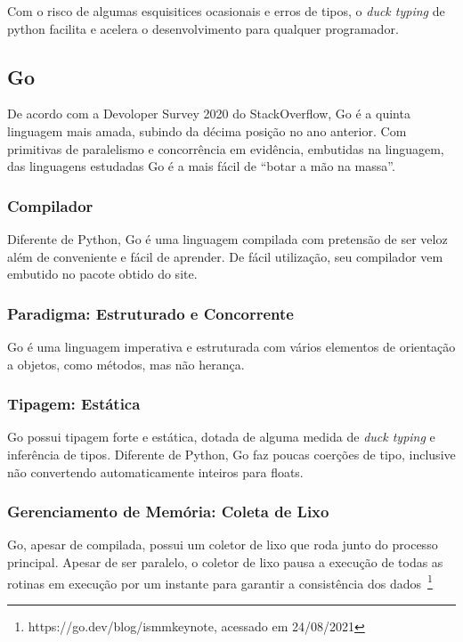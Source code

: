 \documentclass{article}
\begin{document}
Com o risco de algumas esquisitices ocasionais e erros de tipos, o \emph{duck typing} de python facilita e acelera o desenvolvimento para qualquer programador.

\subsection{Go}
\label{ssec:go}

De acordo com a Devoloper Survey 2020 do StackOverflow, Go é a quinta linguagem mais amada, subindo da décima posição no ano anterior. Com primitivas de paralelismo e concorrência em evidência, embutidas na linguagem, das linguagens estudadas Go é a mais fácil de ``botar a mão na massa''.

\subsubsection{Compilador}
\label{sssec:go compilador}

Diferente de Python, Go é uma linguagem compilada com pretensão de ser veloz além de conveniente e fácil de aprender. De fácil utilização, seu compilador vem embutido no pacote obtido do site.

\subsubsection{Paradigma: Estruturado e Concorrente}
\label{sssec:go paradigma}

Go é uma linguagem imperativa e estruturada com vários elementos de orientação a objetos, como métodos, mas não herança.

\subsubsection{Tipagem: Estática}
\label{sssec:go tipagem}

Go possui tipagem forte e estática, dotada de alguma medida de \emph{duck typing} e inferência de tipos. Diferente de Python, Go faz poucas coerções de tipo, inclusive não convertendo automaticamente inteiros para floats.

\subsubsection{Gerenciamento de Memória: Coleta de Lixo}
\label{sssec:go memoria}

Go, apesar de compilada, possui um coletor de lixo que roda junto do processo principal. Apesar de ser paralelo, o coletor de lixo pausa a execução de todas as rotinas em execução por um instante para garantir a consistência dos dados~\footnote{https://go.dev/blog/ismmkeynote, acessado em 24/08/2021}
\end{document}
